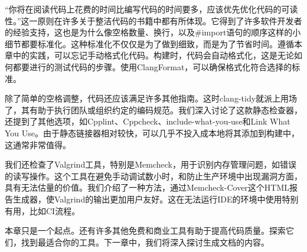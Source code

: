 “你将在阅读代码上花费的时间比编写代码的时间要多，应该优先优化代码的可读性。”这一原则在许多关于整洁代码的书籍中都有所体现。它得到了许多软件开发者的经验支持，这也是为什么像空格数量、换行，以及\#import语句的顺序这样的小细节都要标准化。这种标准化不仅仅是为了做到细致，而是为了节省时间。遵循本章中的实践，可以忘记手动格式化代码。构建时，代码会自动格式化，这是无论如何都要进行的测试代码的步骤。使用ClangFormat，可以确保格式化符合选择的标准。

除了简单的空格调整，代码还应该满足许多其他指南。这时clang-tidy就派上用场了，其有助于执行团队或组织约定的编码规范。我们深入讨论了这款静态检查器，还提到了其他选项，如Cpplint、Cppcheck、include-what-you-use和Link What You Use。由于静态链接器相对较快，可以几乎不投入成本地将其添加到构建中，这通常非常值得。

我们还检查了Valgrind工具，特别是Memcheck，用于识别内存管理问题，如错误的读写操作。这个工具在避免手动调试数小时，和防止生产环境中出现漏洞方面，具有无法估量的价值。我们介绍了一种方法，通过Memcheck-Cover这个HTML报告生成器，使Valgrind的输出更加用户友好。这在无法运行IDE的环境中使用特别有用，比如CI流程。

本章只是一个起点。还有许多其他免费和商业工具有助于提高代码质量。探索它们，找到最适合你的工具。下一章中，我们将深入探讨生成文档的内容。